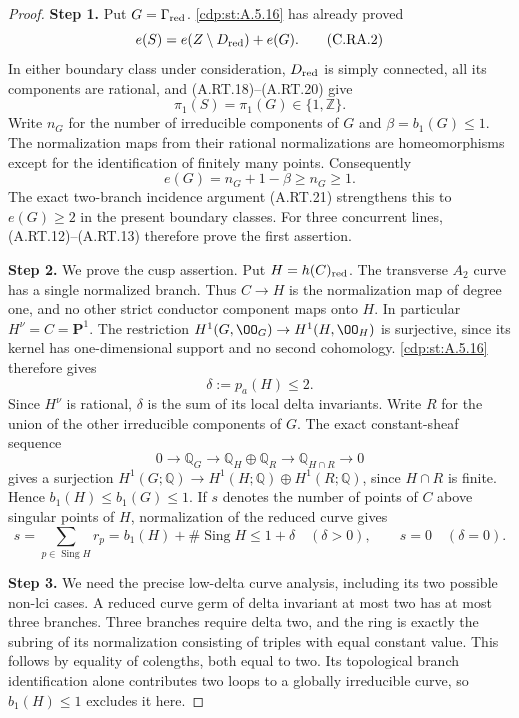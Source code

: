 \begin{proof}
\noindent\textbf{Step 1.} Put $G=\Gamma_{\rm red}$. \ref{cdp:st:A.5.16} has already proved
\[
 e(S)=e(Z\setminus D_{\rm red})+e(G).             \tag{C.RA.2}\label{cdp:eq:C.RA.2}
\]
In either boundary class under consideration, $D_{\rm red}$
is simply connected, all its components are rational, and
(A.RT.18)--(A.RT.20) give
\[
 \pi_1(S)=\pi_1(G)\in\{1,\mathbb Z\}.
 \tag{C.RA.3}\label{cdp:eq:C.RA.3}
\]
Write $n_G$ for the number of irreducible components of $G$
and $\beta=b_1(G)\le1$. The normalization maps from their
rational normalizations are homeomorphisms except for the
identification of finitely many points. Consequently
\[
                   e(G)=n_G+1-\beta\ge n_G\ge1.
 \tag{C.RA.4}\label{cdp:eq:C.RA.4}
\]
The exact two-branch incidence argument (A.RT.21) strengthens
this to $e(G)\ge2$ in the present boundary classes.
For three concurrent lines, (A.RT.12)--(A.RT.13) therefore
prove the first assertion.

\noindent\textbf{Step 2.} We prove the cusp assertion. Put $H=h(C)_{\rm red}$.
The transverse $A_2$ curve has a single normalized branch.
Thus $C\to H$ is the normalization map of degree one, and
no other strict conductor component maps onto $H$.
In particular $H^\nu=C=\mathbf P^1$. The restriction
$H^1(G,\OO_G)\to H^1(H,\OO_H)$ is surjective, since its
kernel has one-dimensional support and no second cohomology.
\ref{cdp:st:A.5.16} therefore gives
\[
              \delta:=p_a(H)\le2.              \tag{C.RA.5}\label{cdp:eq:C.RA.5}
\]
Since $H^\nu$ is rational, $\delta$ is the sum of its local
delta invariants. Write $R$ for the union of the other irreducible components of
$G$. The exact constant-sheaf sequence
\[
 0\longrightarrow\mathbb Q_G\longrightarrow
 \mathbb Q_H\oplus\mathbb Q_R\longrightarrow
 \mathbb Q_{H\cap R}\longrightarrow0
\]
gives a surjection
$H^1(G;\mathbb Q)\to H^1(H;\mathbb Q)\oplus H^1(R;\mathbb Q)$,
since $H\cap R$ is finite. Hence $b_1(H)\le b_1(G)\le1$.
If $s$ denotes the number of points of $C$ above singular
points of $H$, normalization of the reduced curve gives
\[
 s=\sum_{p\in\operatorname{Sing}H}r_p
   =b_1(H)+\#\operatorname{Sing}H\le1+\delta
 \quad(\delta>0),\qquad s=0\quad(\delta=0).       \tag{C.RA.6}\label{cdp:eq:C.RA.6}
\]

\noindent\textbf{Step 3.} We need the precise low-delta curve analysis, including its
two possible non-lci cases. A reduced curve germ of delta
invariant at most two has at most three branches.
Three branches require delta two, and the ring is exactly
the subring of its normalization consisting of triples
with equal constant value. This follows by equality of
colengths, both equal to two. Its topological branch
identification alone contributes two loops to a globally
irreducible curve, so $b_1(H)\le1$ excludes it here.


\end{proof}
